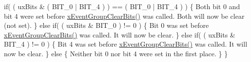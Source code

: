 \begin{DoxyPre}        if( ( uxBits \& ( BIT\_0 | BIT\_4 ) ) == ( BIT\_0 | BIT\_4 ) )
        \{
Both bit 0 and bit 4 were set before \hyperlink{event__groups_8h_a0fb72cfdd4f0d5f86d955fc3af448f2a}{xEventGroupClearBits()} was
called.  Both will now be clear (not set).
        \}
        else if( ( uxBits \& BIT\_0 ) != 0 )
        \{
Bit 0 was set before \hyperlink{event__groups_8h_a0fb72cfdd4f0d5f86d955fc3af448f2a}{xEventGroupClearBits()} was called.  It will
now be clear.
        \}
        else if( ( uxBits \& BIT\_4 ) != 0 )
        \{
Bit 4 was set before \hyperlink{event__groups_8h_a0fb72cfdd4f0d5f86d955fc3af448f2a}{xEventGroupClearBits()} was called.  It will
now be clear.
        \}
        else
        \{
Neither bit 0 nor bit 4 were set in the first place.
        \}
   \}
   \end{DoxyPre}
 